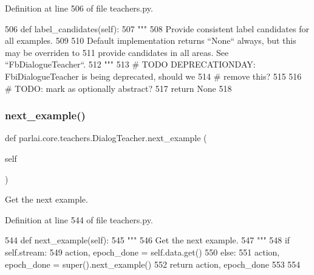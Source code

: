 Definition at line 506 of file teachers.\+py.


\begin{DoxyCode}
506     \textcolor{keyword}{def }label\_candidates(self):
507         \textcolor{stringliteral}{"""}
508 \textcolor{stringliteral}{        Provide consistent label candidates for all examples.}
509 \textcolor{stringliteral}{}
510 \textcolor{stringliteral}{        Default implementation returns ``None`` always, but this may be overriden to}
511 \textcolor{stringliteral}{        provide candidates in all areas. See ``FbDialogueTeacher``.}
512 \textcolor{stringliteral}{        """}
513         \textcolor{comment}{# TODO DEPRECATIONDAY: FbiDialogueTeacher is being deprecated, should we}
514         \textcolor{comment}{# remove this?}
515 
516         \textcolor{comment}{# TODO: mark as optionally abstract?}
517         \textcolor{keywordflow}{return} \textcolor{keywordtype}{None}
518 
\end{DoxyCode}
\mbox{\label{classparlai_1_1core_1_1teachers_1_1DialogTeacher_a738c4571db2fee7ce3ab01072f10ed49}} 
\subsubsection{\texorpdfstring{next\+\_\+example()}{next\_example()}}
{\footnotesize\ttfamily def parlai.\+core.\+teachers.\+Dialog\+Teacher.\+next\+\_\+example (\begin{DoxyParamCaption}\item[{}]{self }\end{DoxyParamCaption})}

\begin{DoxyVerb}Get the next example.
\end{DoxyVerb}
 

Definition at line 544 of file teachers.\+py.


\begin{DoxyCode}
544     \textcolor{keyword}{def }next\_example(self):
545         \textcolor{stringliteral}{"""}
546 \textcolor{stringliteral}{        Get the next example.}
547 \textcolor{stringliteral}{        """}
548         \textcolor{keywordflow}{if} self.stream:
549             action, epoch\_done = self.data.get()
550         \textcolor{keywordflow}{else}:
551             action, epoch\_done = super().next\_example()
552         \textcolor{keywordflow}{return} action, epoch\_done
553 
554 
\end{DoxyCode}
\mbox{\label{classparlai_1_1core_1_1teachers_1_1DialogTeacher_af1e90a07058dc489c45280f0982e21be}} 
